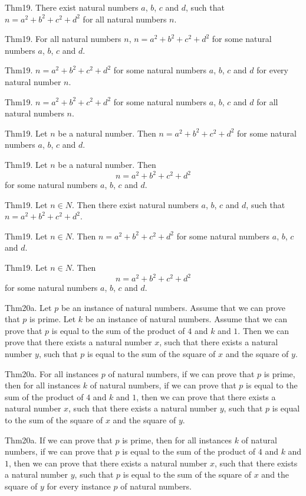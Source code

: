 \documentclass{article}
\begin{document}
Thm19. There exist natural numbers $a$, $b$, $c$ and $d$, such that $n = a ^{ 2}+ b ^{ 2}+ c ^{ 2}+ d ^{ 2}$ for all natural numbers $n$.

Thm19. For all natural numbers $n$, $n = a ^{ 2}+ b ^{ 2}+ c ^{ 2}+ d ^{ 2}$ for some natural numbers $a$, $b$, $c$ and $d$.

Thm19. $n = a ^{ 2}+ b ^{ 2}+ c ^{ 2}+ d ^{ 2}$ for some natural numbers $a$, $b$, $c$ and $d$ for every natural number $n$.

Thm19. $n = a ^{ 2}+ b ^{ 2}+ c ^{ 2}+ d ^{ 2}$ for some natural numbers $a$, $b$, $c$ and $d$ for all natural numbers $n$.

Thm19. Let $n$ be a natural number. Then $n = a ^{ 2}+ b ^{ 2}+ c ^{ 2}+ d ^{ 2}$ for some natural numbers $a$, $b$, $c$ and $d$.

Thm19. Let $n$ be a natural number. Then $$n = a ^{ 2}+ b ^{ 2}+ c ^{ 2}+ d ^{ 2}$$ for some natural numbers $a$, $b$, $c$ and $d$.

Thm19. Let $n \in N$. Then there exist natural numbers $a$, $b$, $c$ and $d$, such that $n = a ^{ 2}+ b ^{ 2}+ c ^{ 2}+ d ^{ 2}$.

Thm19. Let $n \in N$. Then $n = a ^{ 2}+ b ^{ 2}+ c ^{ 2}+ d ^{ 2}$ for some natural numbers $a$, $b$, $c$ and $d$.

Thm19. Let $n \in N$. Then $$n = a ^{ 2}+ b ^{ 2}+ c ^{ 2}+ d ^{ 2}$$ for some natural numbers $a$, $b$, $c$ and $d$.

Thm20a. Let $p$ be an instance of natural numbers. Assume that we can prove that $p$ is prime. Let $k$ be an instance of natural numbers. Assume that we can prove that $p$ is equal to the sum of the product of $4$ and $k$ and $1$. Then we can prove that there exists a natural number $x$, such that there exists a natural number $y$, such that $p$ is equal to the sum of the square of $x$ and the square of $y$.

Thm20a. For all instances $p$ of natural numbers, if we can prove that $p$ is prime, then for all instances $k$ of natural numbers, if we can prove that $p$ is equal to the sum of the product of $4$ and $k$ and $1$, then we can prove that there exists a natural number $x$, such that there exists a natural number $y$, such that $p$ is equal to the sum of the square of $x$ and the square of $y$.

Thm20a. If we can prove that $p$ is prime, then for all instances $k$ of natural numbers, if we can prove that $p$ is equal to the sum of the product of $4$ and $k$ and $1$, then we can prove that there exists a natural number $x$, such that there exists a natural number $y$, such that $p$ is equal to the sum of the square of $x$ and the square of $y$ for every instance $p$ of natural numbers.
\end{document}
